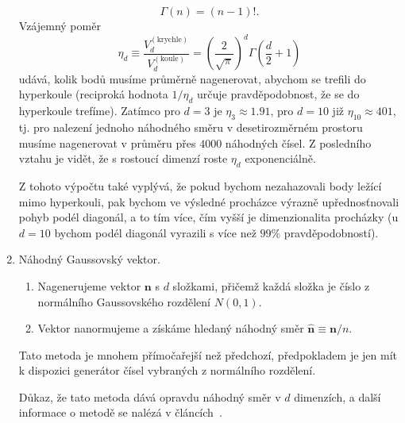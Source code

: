 \documentclass[a4paper,11pt,twoside]{article}
\def\vector#1{\boldsymbol{#1}}			%
\theoremstyle{red}
\theoremstyle{green}
\begin{document}
\begin{solution}
\begin{enumerate}
{                    \begin{equation}
                        \Gamma(n)=(n-1)!.
                    \end{equation}
                }
                Vzájemný poměr
                \begin{equation}
                    \eta_{d}\equiv\frac{V_{d}^{(\text{krychle})}}{V_{d}^{(\text{koule})}}=\left(\frac{2}{\sqrt{\pi}}\right)^{d}\Gamma\left(\frac{d}{2}+1\right)
                \end{equation}
                udává, kolik bodů musíme průměrně nagenerovat, abychom se trefili do hyperkoule (reciproká hodnota $1/\eta_{d}$ určuje pravděpodobnost, že se do hyperkoule trefíme).
                Zatímco pro $d=3$ je $\eta_{3}\approx1.91$, pro $d=10$ již $\eta_{10}\approx401$, tj. pro nalezení jednoho náhodného směru v desetirozměrném prostoru musíme nagenerovat v průměru přes $4000$ náhodných čísel.
                Z posledního vztahu je vidět, že s rostoucí dimenzí roste $\eta_{d}$ exponenciálně.

                Z tohoto výpočtu také vyplývá, že pokud bychom nezahazovali body ležící mimo hyperkouli, pak bychom ve výsledné procházce výrazně upřednosťnovali pohyb podél diagonál, a to tím více, čím vyšší je dimenzionalita procházky (u $d=10$ bychom podél diagonál vyrazili s více než $99\%$ pravděpodobností).
                
            \item Náhodný Gaussovský vektor.
                \begin{enumerate}
                    \item Nagenerujeme vektor $\vector{n}$ s $d$ složkami, přičemž každá složka je číslo z normálního Gaussovského rozdělení $N(0,1)$.
                    \item Vektor nanormujeme a získáme hledaný náhodný směr $\vector{\hat{n}}\equiv\vector{n}/n$. 
                \end{enumerate}
                Tato metoda je mnohem přímočařejší než předchozí, předpokladem je jen mít k dispozici generátor čísel vybraných z normálního rozdělení.

                Důkaz, že tato metoda dává opravdu náhodný směr v $d$ dimenzích, a další informace o metodě se nalézá v článcích~\cite{Muller1959,Marsaglia1972}.


\end{enumerate}
\end{solution}
\end{document}
